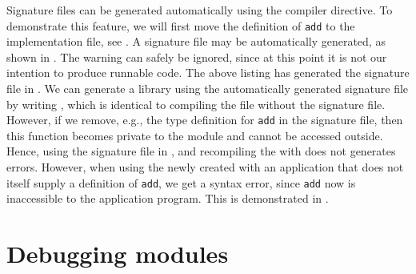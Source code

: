\documentclass[fsharpNotes.tex]{subfiles}
\begin{document}
Signature files can be generated automatically using the  compiler directive. To demonstrate this feature, we will first move the definition of \lstinline{add} to the implementation file, see .
%
%
A signature file may be automatically generated, as shown in .
%
%
The warning can safely be ignored, since at this point it is not our intention to produce runnable code. The above listing has generated the signature file in .
%
%
We can generate a library using the automatically generated signature file by writing , which is identical to compiling the  file without the signature file. However, if we remove, e.g., the type definition for \lstinline{add} in the signature file, then this function becomes private to the module and cannot be accessed outside. Hence, using the signature file in , and recompiling the  with  does not generates errors. 
%
%
%
%
However, when using the newly created  with an application that does not itself supply a definition of \lstinline{add}, we get a syntax error, since \lstinline{add} now is inaccessible to the application program. This is demonstrated in .
%
%
%

\section{Debugging modules}
\end{document}
